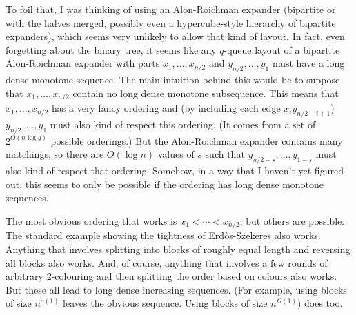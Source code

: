 \documentclass{patmorin}
\begin{document}
To foil that, I was thinking of using an Alon-Roichman expander (bipartite or with the halves merged, possibly even a hypercube-style hierarchy of bipartite expanders), which seems very unlikely to allow that kind of layout.  In fact, even forgetting about the binary tree, it seems like any $q$-queue layout of a bipartite Alon-Roichman expander with parts $x_1,\ldots,x_{n/2}$ and $y_{n/2},\ldots,y_{1}$ must have a long dense monotone sequence.   The main intuition behind this would be to suppose that $x_1,\ldots,x_{n/2}$ contain no long dense monotone subsequence.  This means that $x_1,\ldots,x_{n/2}$ has a very fancy ordering and (by including each edge $x_iy_{n/2-i+1}$) $y_{n/2},\ldots,y_{1}$ must also kind of respect this ordering.  (It comes from a set of $2^{O(n\log q)}$ possible orderings.)  But the Alon-Roichman expander contains many matchings, so there are $O(\log n)$ values of $s$ such that $y_{n/2-s},\ldots,y_{1-s}$ must also kind of respect that ordering.   Somehow, in a way that I haven't yet figured out, this seems to only be possible if the ordering has long dense monotone sequences.

The most obvious ordering that works is $x_1<\cdots<x_{n/2}$, but others are possible. The standard example showing the tightness of Erd\H{o}s-Szekeres also works.  Anything that involves splitting into blocks of roughly equal length and reversing all blocks also works.  And, of course, anything that involves a few rounds of arbitrary $2$-colouring and then splitting the order based on colours also works.  But these all lead to long dense increasing sequences.  (For example, using blocks of size $n^{o(1)}$ leaves the obvious sequence.  Using blocks of size $n^{\Omega(1)})$ does too.



%
%
\end{document}
